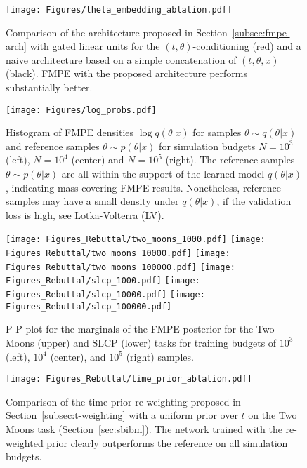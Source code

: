 \documentclass{article}
\theoremstyle{remark}
\begin{document}
\begin{figure}
  \vspace{-5pt}
  \centering
  \texttt{[image: Figures/theta\_embedding\_ablation.pdf]}
  \vspace{-5pt}
  \caption{\label{fig:benchmark-theta-embedding}
  Comparison of the architecture proposed in Section~\ref{subsec:fmpe-arch} with gated linear units for the $(t,\theta)$-conditioning (red) and a naive architecture based on a simple concatenation of $(t, \theta, x)$ (black). FMPE with the proposed architecture performs substantially better.
  }
\end{figure}
\begin{figure}
  \centering
  \texttt{[image: Figures/log\_probs.pdf]}
  \caption{\label{fig:sbibm-logprobs-all}
    Histogram of FMPE densities $\log q(\theta|x)$ for samples
    $\theta\sim q(\theta|x)$ and reference samples $\theta\sim p(\theta|x)$ for simulation budgets $N=10^3$ (left), $N=10^4$ (center) and $N=10^5$ (right). The reference samples $\theta\sim p(\theta|x)$ are all within the support of the learned model $q(\theta|x)$, indicating mass covering FMPE results. Nonetheless, reference samples may have a small density under $q(\theta|x)$, if the validation loss is high, see Lotka-Volterra (LV).
  }
\end{figure}

\begin{figure}[ht]
  \centering
  \texttt{[image: Figures\_Rebuttal/two\_moons\_1000.pdf]}\hfill
  \texttt{[image: Figures\_Rebuttal/two\_moons\_10000.pdf]}\hfill
  \texttt{[image: Figures\_Rebuttal/two\_moons\_100000.pdf]}
  \texttt{[image: Figures\_Rebuttal/slcp\_1000.pdf]}\hfill
  \texttt{[image: Figures\_Rebuttal/slcp\_10000.pdf]}\hfill
  \texttt{[image: Figures\_Rebuttal/slcp\_100000.pdf]}
  \caption{\label{fig:p-p}P-P plot for the marginals of the FMPE-posterior for the Two Moons (upper) and SLCP (lower) tasks for training budgets of 
  $10^3$ (left), $10^4$ (center), and $10^5$ (right) samples.}
\end{figure}
\begin{figure}[ht]
  \centering
  \texttt{[image: Figures\_Rebuttal/time\_prior\_ablation.pdf]}
  \caption{\label{fig:ablation-time-prior}Comparison of the time prior re-weighting proposed in Section~\ref{subsec:t-weighting} with a uniform prior over $t$ on the Two Moons task (Section~\ref{sec:sbibm}). The network trained with the re-weighted prior clearly outperforms the reference on all simulation budgets.}
\end{figure}
\end{document}
